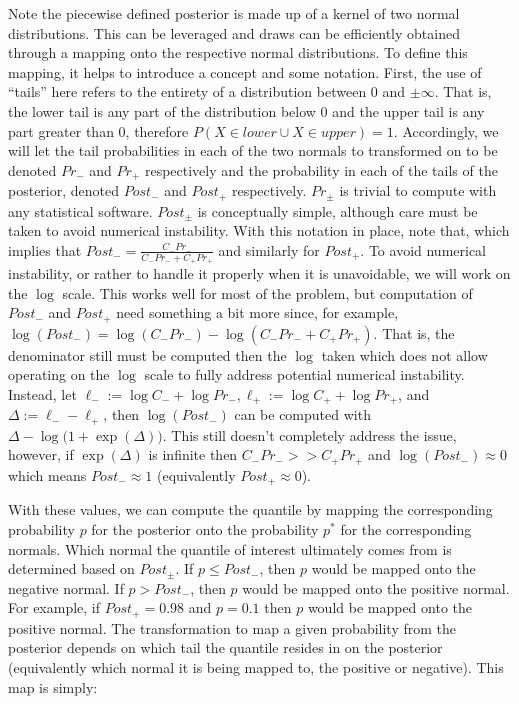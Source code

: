 Note the piecewise defined posterior is made up of a kernel of two normal distributions. This can be leveraged and draws can be efficiently obtained through a mapping onto the respective normal distributions. To define this mapping, it helps to introduce a concept and some notation. First, the use of ``tails'' here refers to the entirety of a distribution between 0 and $\pm \infty$. That is, the lower tail is any part of the distribution below 0 and the upper tail is any part greater than 0, therefore $P(X \in lower \cup X \in upper) = 1$. Accordingly, we will let the tail probabilities in each of the two normals to transformed on to be denoted $Pr_{-}$ and $Pr_{+}$ respectively and the probability in each of the tails of the posterior, denoted $Post_{-}$ and $Post_{+}$ respectively. $Pr_{\pm}$ is trivial to compute with any statistical software. $Post_{\pm}$ is conceptually simple, although care must be taken to avoid numerical instability. With this notation in place, note that,
 which implies that $Post_- = \frac{C_{-} Pr_{-}}{C_{-} Pr_{-} + C_{+} Pr_{+}}$ and similarly for $Post_+$. To avoid numerical instability, or rather to handle it properly when it is unavoidable, we will work on the $\log$ scale. This works well for most of the problem, but computation of $Post_-$ and $Post_+$ need something a bit more since, for example, $\log(Post_-) = \log(C_{-}Pr_{-}) - \log(C_{-} Pr_{-} + C_{+} Pr_{+})$. That is, the denominator still must be computed then the $\log$ taken which does not allow operating on the $\log$ scale to fully address potential numerical instability. Instead, let $\ell_{-} := \log C_{-} + \log Pr_{-}, \ell_{+} := \log C_{+} + \log Pr_{+}$, and $\Delta := \ell_{-} - \ell_{+}$, then $\log(Post_-)$ can be computed with $\Delta - \log\bigl(1 + \exp(\Delta)\bigr)$. This still doesn't completely address the issue, however, if $\exp(\Delta)$ is infinite then $C_-Pr_- >> C_+Pr_+$ and $\log(Post_-) \approx 0$ which means $Post_- \approx 1$ (equivalently $Post_+ \approx 0$).

With these values, we can compute the quantile by mapping the corresponding probability $p$ for the posterior onto the probability $p^*$ for the corresponding normals. Which normal the quantile of interest ultimately comes from is determined based on $Post_{\pm}$. If $p \leq Post_{-}$, then $p$ would be mapped onto the negative normal. If $p > Post_{-}$, then $p$ would be mapped onto the positive normal.  For example, if $Post_{+} = 0.98$ and $p = 0.1$ then $p$ would be mapped onto the positive normal. The transformation to map a given probability from the posterior depends on which tail the quantile resides in on the posterior (equivalently which normal it is being mapped to, the positive or negative). This map is simply:

